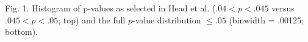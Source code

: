 Fig. 1. Histogram of p-values as selected in Head et al. ($.04 < p < .045$ versus $.045 < p < .05$; top) and the full $p$-value distribution $\leq.05$ (binwidth = .00125; bottom).
  